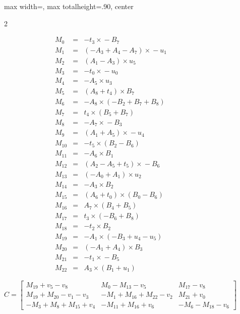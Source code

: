\documentclass[11pt]{article}
\begin{document}
\begin{figure}[H]
\begin{adjustbox}{max width=\textwidth,
                    max totalheight=.90\textheight,   %
                    center}
\begin{minipage}{\linewidth}
\begin{multicols}{2}
\columnbreak

\begin{align*}
M_{0} &=& -t_{3}\times{}-B_{7}\\
M_{1} &=& (-A_{3}+A_{4}-A_{7})\times{}-u_{1}\\
M_{2} &=& (A_{1}-A_{3})\times{}u_{5}\\
M_{3} &=& -t_{0}\times{}-u_{0}\\
M_{4} &=& -A_{5}\times{}u_{3}\\
M_{5} &=& (A_{8}+t_{4})\times{}B_{7}\\
M_{6} &=& -A_{8}\times{}(-B_{2}+B_{7}+B_{8})\\
M_{7} &=& t_{4}\times{}(B_{5}+B_{7})\\
M_{8} &=& -A_{7}\times{}-B_{3}\\
M_{9} &=& (A_{1}+A_{5})\times{}-u_{4}\\
M_{10} &=& -t_{5}\times{}(B_{2}-B_{6})\\
M_{11} &=& -A_{6}\times{}B_{1}\\
M_{12} &=& (A_{2}-A_{5}+t_{5})\times{}-B_{6}\\
M_{13} &=& (-A_{0}+A_{1})\times{}u_{2}\\
M_{14} &=& -A_{3}\times{}B_{2}\\
M_{15} &=& (A_{6}+t_{0})\times{}(B_{0}-B_{6})\\
M_{16} &=& A_{7}\times{}(B_{4}+B_{5})\\
M_{17} &=& t_{3}\times{}(-B_{6}+B_{8})\\
M_{18} &=& -t_{2}\times{}B_{2}\\
M_{19} &=& -A_{1}\times{}(-B_{3}+u_{4}-u_{5})\\
M_{20} &=& (-A_{1}+A_{4})\times{}B_{3}\\
M_{21} &=& -t_{1}\times{}-B_{5}\\
M_{22} &=& A_{3}\times{}(B_{1}+u_{1})
\end{align*}
\end{multicols}

\[
C=\begin{bmatrix}
M_{19}+v_{5}-v_{8} & M_{0}-M_{13}-v_{5} & M_{17}-v_{8}\\
M_{19}+M_{20}-v_{1}-v_{3} & -M_{1}+M_{16}+M_{22}-v_{2} & M_{21}+v_{0}\\
-M_{3}+M_{8}+M_{15}+v_{4} & -M_{11}+M_{16}+v_{6} & -M_{6}-M_{18}-v_{6}
\end{bmatrix}
\]
\end{minipage}
\end{adjustbox}
\end{figure}
\end{document}

